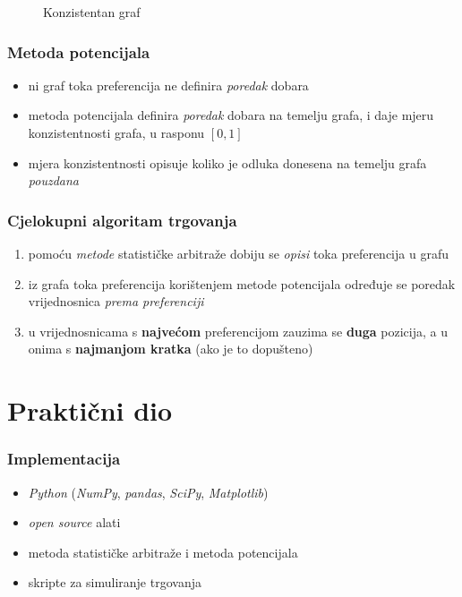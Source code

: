 \documentclass[11pt, notheorems]{beamer}
\newcommand{\q}{\left}
\newcommand{\w}{\right}
\begin{document}
\begin{frame}
{\begin{figure}
\begin{minipage}{0.45\textwidth}
          \caption{Konzistentan graf}
        \end{minipage}
      \end{figure}}
  \end{frame}

  \begin{frame}
    \frametitle{Metoda potencijala}
    \begin{itemize}
      \item ni \alert{graf toka preferencija} ne definira \emph{poredak} dobara
      \item \alert{metoda potencijala} definira \emph{poredak} dobara na temelju grafa, i daje \alert{mjeru konzistentnosti} grafa, u rasponu $\q[0, 1\w]$
      \item \alert{mjera konzistentnosti} opisuje koliko je odluka donesena na temelju grafa \emph{pouzdana}
    \end{itemize}
  \end{frame}

  \begin{frame}
    \frametitle{Cjelokupni algoritam trgovanja}
    \begin{enumerate}
      \item pomoću \emph{metode} \alert{statističke arbitraže} dobiju se \emph{opisi} \alert{toka preferencija} u grafu
      \item iz \alert{grafa toka preferencija} korištenjem \alert{metode potencijala} određuje se poredak vrijednosnica \emph{prema preferenciji}
      \item u vrijednosnicama s \textbf{najvećom} preferencijom zauzima se \textbf{duga} pozicija, a u onima s \textbf{najmanjom kratka} (ako je to dopušteno)
    \end{enumerate}
  \end{frame}

  \section{Praktični dio}
  \begin{frame}
    \frametitle{Implementacija}
    \begin{itemize}
      \item \alert{\textit{Python}} (\emph{NumPy}, \emph{pandas}, \emph{SciPy}, \emph{Matplotlib})
      \item \emph{open source} alati
      \item metoda statističke arbitraže i metoda potencijala
      \item skripte za simuliranje trgovanja
    \end{itemize}
  \end{frame}
\end{document}
